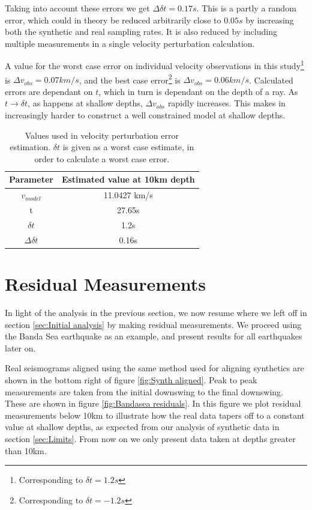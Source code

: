 \documentclass[11pt,a4paper]{article}
\begin{document}
Taking into account these errors we get $\Delta \delta t = 0.17s$. This is a partly a random error, which could in theory be reduced arbitrarily close to $0.05s$ by increasing both the synthetic and real sampling rates. It is also reduced by including multiple measurements in a single velocity perturbation calculation.

A value for the worst case error on individual velocity observations in this study\footnote{Corresponding to $\delta t = 1.2s$} is $\Delta v_{obs} = 0.07 km/s$, and the best case error\footnote{Corresponding to $\delta t = -1.2s$} is $\Delta v_{obs} = 0.06 km/s$. Calculated errors are dependant on $t$, which in turn is dependant on the depth of a ray. As $t \rightarrow \delta t$, as happens at shallow depths, $\Delta v_{obs}$ rapidly increases. This makes in increasingly harder to construct a well constrained model at shallow depths.

\begin{table}
\centering
\begin{tabular}{| c | c |}
	\hline
	Parameter		& Estimated value at 10km depth	\\ \hline \hline
	$v_{model}$	& 11.0427 km/s					\\ \hline
	t			& 27.65s						\\ \hline
	$\delta t$		& 1.2s						\\ \hline
	$\Delta \delta t$	& 0.16s						\\				
	\hline
\end{tabular}
\caption{Values used in velocity perturbation error estimation. $\delta t$ is given as a worst case estimate, in order to calculate a worst case error.}
\label{tab:Error values}
\end{table}

\section{Residual Measurements}
\label{sec:Resid measurements}

In light of the analysis in the previous section, we now resume where we left off in section \ref{sec:Initial analysis} by making residual measurements. We proceed using the Banda Sea earthquake as an example, and present results for all earthquakes later on.

Real seismograms aligned using the same method used for aligning synthetics are shown in the bottom right of figure \ref{fig:Synth aligned}. Peak to peak measurements are taken from the initial downswing to the final downswing. These are shown in figure \ref{fig:Bandasea residuals}. In this figure we plot residual measurements below 10km to illustrate how the real data tapers off to a constant value at shallow depths, as expected from our analysis of synthetic data in section \ref{sec:Limits}. From now on we only present data taken at depths greater than 10km.
\end{document}
